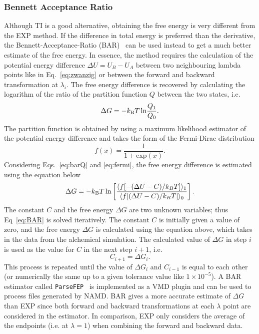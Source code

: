 \subsubsection{Bennett Acceptance Ratio}
Although TI is a good alternative, obtaining the free energy is very different from the EXP 
method. If the difference in total energy is preferred than the derivative, the 
Bennett-Acceptance-Ratio (BAR)~\cite{Bennett1976} can be used instead to get a much better 
estimate of the free energy. In essence, the method requires the calculation of the potential 
energy difference $\Delta U=U_{B}-U_{A}$ between two neighbouring lambda points like in 
Eq.~\eqref{eq:zwanzig} or between the forward and backward transformation at $\lambda_{i}$. 
The free energy difference is recovered by calculating the logarithm of the ratio of the 
partition function $Q$ between the two states, i.e. 
\begin{equation}
\Delta G = -k_{\text{B}}T \,\text{ln}\frac{Q_{1}}{Q_{0}}.
\label{eq:barQ}
\end{equation}
The partition function is obtained by using a maximum likelihood estimator of the potential 
energy difference and takes the form of the Fermi-Dirac distribution
\begin{equation}
f(x) = \frac{1}{1+ \text{exp}(x)}.
\label{eq:fermi}
\end{equation}
Considering Eqs.~\eqref{eq:barQ} and \eqref{eq:fermi}, the free energy difference is estimated 
using the equation below
\begin{equation}
\Delta G = -k_{\text{B}}T \,\text{ln} \left[ \frac{\langle f[-(\Delta U-C)/k_{B}T] \rangle_{1}}{\langle f[(\Delta U-C)/k_{B}T] \rangle_{0}} \right].
\label{eq:BAR}
\end{equation}
The constant $C$ and the free energy $\Delta G$ are two unknown variables; thus 
Eq~\eqref{eq:BAR} is solved iteratively. The constant $C$ is initially given a value of zero, 
and the free energy $\Delta G$ is calculated using the equation above, which takes in the data 
from the alchemical simulation. The calculated value of $\Delta G$ in step $i$ is used as the 
value for $C$ in the next step $i+1$, i.e.
\begin{equation}
    C_{i+1} = \Delta G_{i} .
\end{equation}
This process is repeated until the value of $\Delta G_{i}$ and $C_{i-1}$ is equal to each other 
(or numerically the same up to a given tolerance value like $1 \times 10^{-5}$). A BAR estimator 
called \verb+ParseFEP+~\cite{Liu2012} is implemented as a VMD plugin and can be used to process 
files generated by NAMD. BAR gives a more accurate estimate of $\Delta G$ than EXP since both 
forward and backward transformations at each $\lambda$ point are considered in the estimator. 
In comparison, EXP only considers the average of the endpoints (i.e. at $\lambda=1$) when 
combining the forward and backward data.

